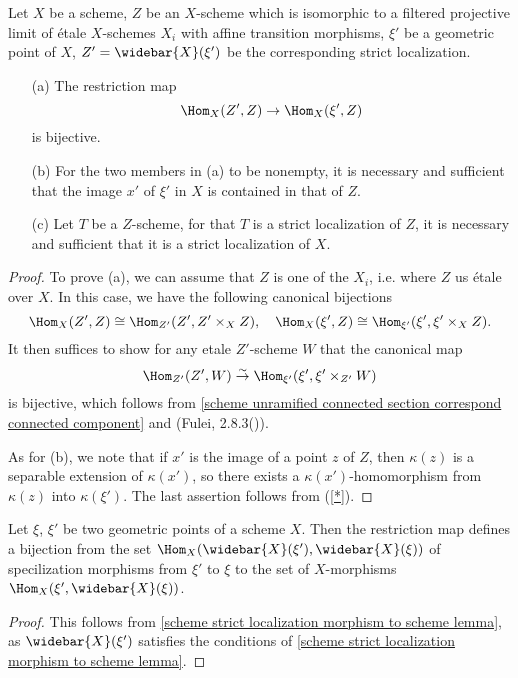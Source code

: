 \begin{lemma}\label{scheme strict localization morphism to scheme lemma}
Let $X$ be a scheme, $Z$ be an $X$-scheme which is isomorphic to a filtered projective limit of \'etale $X$-schemes $X_i$ with affine transition morphisms, $\xi'$ be a geometric point of $X$, $Z'=\widebar{X}(\xi')$ be the corresponding strict localization.
\begin{enumerate}
    \item[(a)] The restriction map 
    \[\Hom_X(Z',Z)\to\Hom_X(\xi',Z)\]
    is bijective.
    \item[(b)] For the two members in (a) to be nonempty, it is necessary and sufficient that the image $x'$ of $\xi'$ in $X$ is contained in that of $Z$.
    \item[(c)] Let $T$ be a $Z$-scheme, for that $T$ is a strict localization of $Z$, it is necessary and sufficient that it is a strict localization of $X$.
\end{enumerate}
\end{lemma}
\begin{proof}
To prove (a), we can assume that $Z$ is one of the $X_i$, i.e. where $Z$ us \'etale over $X$. In this case, we have the following canonical bijections
\[\Hom_X(Z',Z)\cong \Hom_{Z'}(Z',Z'\times_XZ),\quad \Hom_X(\xi',Z)\cong \Hom_{\xi'}(\xi',\xi'\times_XZ).\]
It then suffices to show for any etale $Z'$-scheme $W$ that the canonical map
\[\Hom_{Z'}(Z',W)\stackrel{\sim}{\to} \Hom_{\xi'}(\xi',\xi'\times_{Z'}W)\]
is bijective, which follows from \cref{scheme unramified connected section correspond connected component} and (Fulei, 2.8.3()).\par
As for (b), we note that if $x'$ is the image of a point $z$ of $Z$, then $\kappa(z)$ is a separable extension of $\kappa(x')$, so there exists a $\kappa(x')$-homomorphism from $\kappa(z)$ into $\kappa(\xi')$. The last assertion follows from (\cref{*}).
\end{proof}

\begin{proposition}\label{scheme geometric point specialization bijection to Hom}
Let $\xi$, $\xi'$ be two geometric points of a scheme $X$. Then the restriction map defines a bijection from the set $\Hom_X(\widebar{X}(\xi'),\widebar{X}(\xi))$ of specilization morphisms from $\xi'$ to $\xi$ to the set of $X$-morphisms $\Hom_X(\xi',\widebar{X}(\xi))$.
\end{proposition}
\begin{proof}
This follows from \cref{scheme strict localization morphism to scheme lemma}, as $\widebar{X}(\xi')$ satisfies the conditions of \cref{scheme strict localization morphism to scheme lemma}.
\end{proof}

